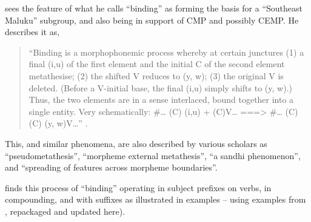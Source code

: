 \citet[250--254]{Mills1991} sees the feature of what he calls “binding”
as forming the basis for a “Southeast Maluku” subgroup,
and also being in support of CMP and possibly CEMP.
He describes it as,

\begin{quote}
		“Binding is a morphophonemic process whereby at certain junctures
		(1) a final (i,u) of the first element
		and the initial C of the second element metathesise;
		(2) the shifted V reduces to (y, w);
		(3) the original V is deleted.
		(Before a V-initial base,
		the final (i,u) simply shifts to (y, w).)
		Thus, the two elements are in a sense interlaced,
		bound together into a single entity.
		Very schematically: {\#}{\ldots} (C) (i,u) + (C)V{\ldots} ===>
		{\#}{\ldots} (C){\0}(C) (y, w)V{\ldots}” \citep[250]{Mills1991}.
\end{quote}

This, and similar phenomena, are also described by various scholars
as “pseudometathesis”, “morpheme external metathesis”, “a sandhi phenomenon”,
and “spreading of features across morpheme boundaries”.

\citeauthor{Mills1991} finds this process of ``binding'' operating in subject prefixes
on verbs, in compounding, and with suffixes as illustrated in examples
-- using examples from \citet{Mills1991},
repackaged and updated here).




